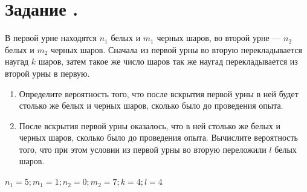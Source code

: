 \documentclass[12pt]{article}
\begin{document}
\section*{Задание .}
В первой урне находятся $n_1$ белых и $m_1$ черных шаров, во второй урне --- $n_2$ белых и $m_2$ черных шаров. Сначала из первой урны во вторую перекладывается наугад $k$ шаров, затем такое же число шаров так же наугад перекладывается из второй урны в первую.
\begin{enumerate}
	\item Определите вероятность того, что после вскрытия первой урны в ней будет столько же белых и черных шаров, сколько было до проведения опыта.
	\item После вскрытия первой урны оказалось, что в ней столько же белых и черных шаров, сколько было до проведения опыта. Вычислите вероятность того, что при этом условии из первой урны во вторую переложили $l$ белых шаров.
\end{enumerate}
$n_1 = 5; m_1 = 1; n_2 = 0; m_2 = 7; k=4; l =4$
\newpage
\end{document}
